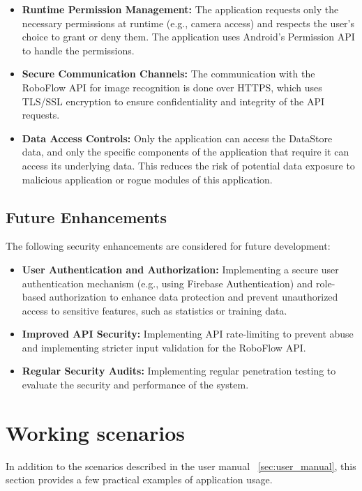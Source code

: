 \begin{itemize}
    \item \textbf{Runtime Permission Management:} The application requests only the necessary permissions at runtime (e.g., camera access) and respects the user's choice to grant or deny them. The application uses Android's Permission API to handle the permissions.
    \item \textbf{Secure Communication Channels:} The communication with the RoboFlow API for image recognition is done over HTTPS, which uses TLS/SSL encryption to ensure confidentiality and integrity of the API requests.
     \item \textbf{Data Access Controls:} Only the application can access the DataStore data, and only the specific components of the application that require it can access its underlying data. This reduces the risk of potential data exposure to malicious application or rogue modules of this application.
\end{itemize}

\subsection{Future Enhancements}

The following security enhancements are considered for future development:

\begin{itemize}
    \item \textbf{User Authentication and Authorization:}  Implementing a secure user authentication mechanism (e.g., using Firebase Authentication) and role-based authorization to enhance data protection and prevent unauthorized access to sensitive features, such as statistics or training data.
    \item \textbf{Improved API Security:} Implementing API rate-limiting to prevent abuse and implementing stricter input validation for the RoboFlow API.
     \item \textbf{Regular Security Audits:} Implementing regular penetration testing to evaluate the security and performance of the system.
\end{itemize}

\section{Working scenarios}

In addition to the scenarios described in the user manual ~\ref{sec:user_manual}, this section provides a few practical examples of application usage.

